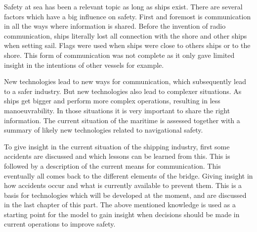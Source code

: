 Safety at sea has been a relevant topic as long as ships exist. There are several factors which have a big influence on safety. First and foremost is communication in all the ways where information is shared. Before the invention of radio communication, ships literally lost all connection with the shore and other ships when setting sail. Flags were used when ships were close to others ships or to the shore. This form of communication was not complete as it only gave limited insight in the intentions of other vessels for example.

New technologies lead to new ways for communication, which subsequently lead to a safer industry. But new technologies also lead to complexer situations. As ships get bigger and perform more complex operations, resulting in less manoeuvrability. In those situations it is very important to share the right information. The current situation of the maritime is assessed together with a summary of likely new technologies related to navigational safety. 

To give insight in the current situation of the shipping industry, first some accidents are discussed and which lessons can be learned from this. This is followed by a description of the current means for communication. This eventually all comes back to the different elements of the bridge. Giving insight in how accidents occur and what is currently available to prevent them. This is a basis for technologies which will be developed at the moment, and are discussed in the last chapter of this part. The above mentioned knowledge is used as a starting point for the model to gain insight when decisions should be made in current operations to improve safety.